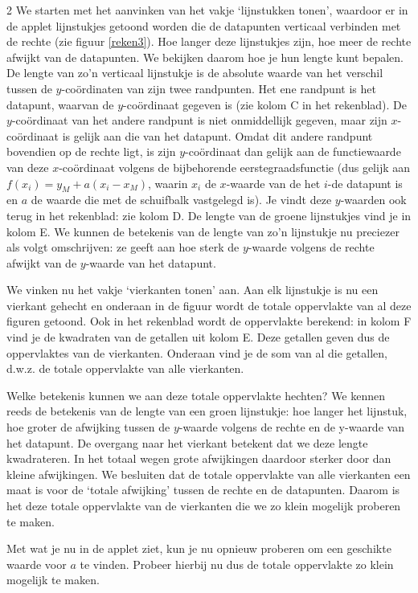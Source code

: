 \begin{multicols}{2}
We starten met het aanvinken van het vakje `lijnstukken tonen’, waardoor er in de applet lijnstukjes getoond worden die de datapunten verticaal verbinden met de rechte (zie figuur \ref{reken3}). Hoe langer deze lijnstukjes zijn, hoe meer de rechte afwijkt van de datapunten. We bekijken daarom hoe je hun lengte kunt bepalen. De lengte van zo’n verticaal lijnstukje is de absolute waarde van het verschil tussen de $y$-coördinaten van zijn twee randpunten. Het ene randpunt is het datapunt, waarvan de $y$-coördinaat gegeven is (zie kolom C in het rekenblad). De $y$-coördinaat van het andere randpunt is niet onmiddellijk gegeven, maar zijn $x$-coördinaat is gelijk aan die van het datapunt. Omdat dit andere randpunt bovendien op de rechte ligt, is zijn $y$-coördinaat dan gelijk aan de functiewaarde van deze $x$-coördinaat volgens de bijbehorende eerstegraadsfunctie (dus gelijk aan $f(x_i)=y_M+a\left(x_i-x_M\right)$, waarin $x_i$ de $x$-waarde van de het $i$-de datapunt is en $a$ de waarde die met de schuifbalk vastgelegd is). Je vindt deze $y$-waarden ook terug in het rekenblad: zie kolom D. De lengte van de groene lijnstukjes vind je in kolom E. We kunnen de betekenis van de lengte van zo’n lijnstukje nu preciezer als volgt omschrijven: ze geeft aan hoe sterk de $y$-waarde volgens de rechte afwijkt van de $y$-waarde van het datapunt.

We vinken nu het vakje `vierkanten tonen’ aan. Aan elk lijnstukje is nu een vierkant gehecht en onderaan in de figuur wordt de totale oppervlakte van al deze figuren getoond. Ook in het rekenblad wordt de oppervlakte berekend: in kolom F vind je de kwadraten van de getallen uit kolom E. Deze getallen geven dus de oppervlaktes van de vierkanten. Onderaan vind je de som van al die getallen, d.w.z. de totale oppervlakte van alle vierkanten.

Welke betekenis kunnen we aan deze totale oppervlakte hechten? We kennen reeds de betekenis van de lengte van een groen lijnstukje: hoe langer het lijnstuk, hoe groter de afwijking tussen de $y$-waarde volgens de rechte en de y-waarde van het datapunt. De overgang naar het vierkant betekent dat we deze lengte kwadrateren. In het totaal wegen grote afwijkingen daardoor sterker door dan kleine afwijkingen. We besluiten dat de totale oppervlakte van alle vierkanten een maat is voor de `totale afwijking’ tussen de rechte en de datapunten. Daarom is het deze totale oppervlakte van de vierkanten die we zo klein mogelijk proberen te maken.

Met wat je nu in de applet ziet, kun je nu opnieuw proberen om een geschikte waarde voor $a$ te vinden. Probeer hierbij nu dus de totale oppervlakte zo klein mogelijk te maken.
\end{multicols}
